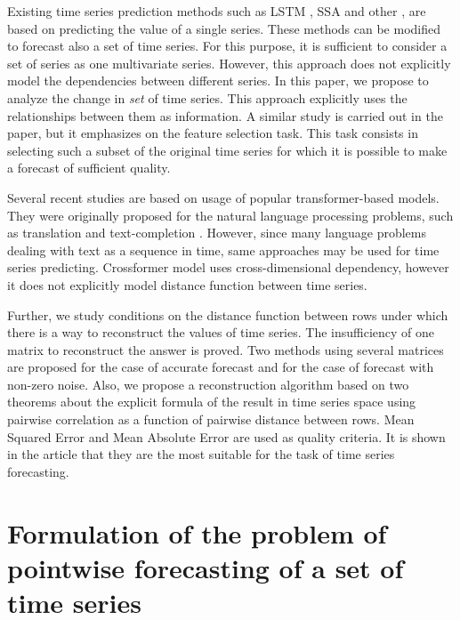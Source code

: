 \documentclass{article}
\begin{document}
	Existing time series prediction methods such as LSTM \cite{LSTM}, SSA \cite{SSA} and other \cite{Biosignals}, \cite{boyd2017multiperiod} are based on predicting the value of a single series. These methods can be modified to forecast also a set of time series. For this purpose, it is sufficient to consider a set of series as one multivariate series. However, this approach does not explicitly model the dependencies between different series. In this paper, we propose to analyze the change in \textit{set} of time series. This approach explicitly uses the relationships between them as information. A similar study is carried out in the \cite{MulticorrelatedQuadratic} paper, but it emphasizes on the feature selection task. This task consists in selecting such a subset of the original time series for which it is possible to make a forecast of sufficient quality.
	
	Several recent studies \cite{haoyietal-informer-2021} \cite{haoyietal-informerEx-2023} \cite{wu2021autoformer} \cite{liu2022pyraformer} are based on usage of popular transformer-based models. They were originally proposed for the natural language processing problems, such as translation and text-completion \cite{NIPS2017_3f5ee243}. However, since many language problems dealing with text as a sequence in time, same approaches may be used for time series predicting. Crossformer \cite{zhang2023crossformer} model uses cross-dimensional dependency, however it does not explicitly model distance function between time series.
	
	Further, we study conditions on the distance function between rows under which there is a way to reconstruct the values of time series. The insufficiency of one matrix to reconstruct the answer is proved. Two methods using several matrices are proposed for the case of accurate forecast and for the case of forecast with non-zero noise. Also, we propose a reconstruction algorithm based on two theorems about the explicit formula of the result in time series space using pairwise correlation as a function of pairwise distance between rows. Mean Squared Error and Mean Absolute Error are used as quality criteria. It is shown in the article \cite{jadon2022comprehensive} that they are the most suitable for the task of time series forecasting.

\section{Formulation of the problem of pointwise forecasting of a set of time series}
\end{document}
